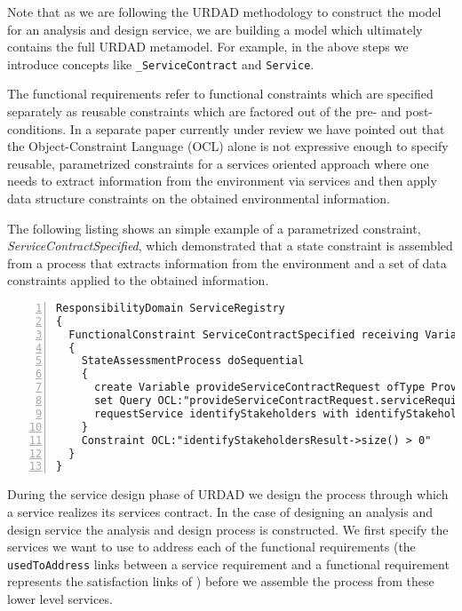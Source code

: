 Note that as we are following the URDAD methodology to construct the model for an analysis and design service, we are building a model which ultimately contains the full URDAD metamodel. For example, in the above steps we introduce concepts like \verb+_ServiceContract+ and \verb+Service+. 

The functional requirements refer to functional constraints which are specified separately as reusable constraints which are factored out of the pre- and post-conditions. In a separate paper currently under review we have pointed out that the Object-Constraint Language (OCL)\cite{_object_2010}  alone is not expressive enough to specify reusable, parametrized constraints for a services oriented approach where one needs to extract information from the environment via services and then apply data structure constraints on the obtained environmental information.

The following listing shows an simple example of a parametrized constraint, \emph{ServiceContractSpecified}, which demonstrated that a state constraint is assembled from a process that extracts information from the environment and a set of data constraints applied to the obtained information.
\lstset{language=urdad,caption=Specifying a state constraint in the URDAD text grammar.,label=serviceContractSpecifiedConstraint}
\begin{lstlisting}[numbers=left,escapechar=|]
ResponsibilityDomain ServiceRegistry
{
  FunctionalConstraint ServiceContractSpecified receiving Variable serviceRequirements ofType _ServiceRequirements 
  {
    StateAssessmentProcess doSequential 
    {
      create Variable provideServiceContractRequest ofType ProvideServiceContractRequest
      set Query OCL:"provideServiceContractRequest.serviceRequirements" equalTo Query OCL:"serviceRequirements"
      requestService identifyStakeholders with identifyStakeholdersRequest yielding Variable identifyStakeholdersResult ofType IdentifyStakeholdersResult
    }
    Constraint OCL:"identifyStakeholdersResult->size() > 0"
  }
}
\end{lstlisting}

During the service design phase of URDAD we design the process through which a service realizes its services contract. In the case of designing an analysis and design service the analysis and design process is constructed. We first specify the services we want to use to address each of the functional requirements (the \verb+usedToAddress+ links between a service requirement and a functional requirement represents the satisfaction links of \cite{ramesh_toward_2001}) before we assemble the process from these lower level services.

